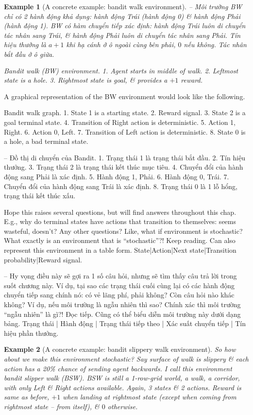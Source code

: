 \documentclass{article}
\newtheorem{example}{Example}
\begin{document}
\begin{itemize}
\begin{itemize}
\begin{itemize}
\begin{example}[A concrete example: bandit walk environment]
                -- Môi trường BW chỉ có 2 hành động khả dụng: hành động Trái (hành động 0) \& hành động Phải (hành động 1). BW có hàm chuyển tiếp xác định: hành động Trái luôn di chuyển tác nhân sang Trái, \& hành động Phải luôn di chuyển tác nhân sang Phải. Tín hiệu thưởng là $a + 1$ khi hạ cánh ở ô ngoài cùng bên phải, $0$ nếu không. Tác nhân bắt đầu ở ô giữa.

                {\sf Bandit walk (BW) environment.} 1. Agent starts in middle of walk. 2. Leftmost state is a hole. 3. Rightmost state is goal, \& provides a $+1$ reward.
            \end{example}
            A graphical representation of the BW environment would look like the following.

            {\sf Bandit walk graph.} 1. State 1 is a starting state. 2. Reward signal. 3. State 2 is a goal terminal state. 4. Transition of Right action is deterministic. 5. Action 1, Right. 6. Action 0, Left. 7. Transition of Left action is deterministic. 8. State 0 is a hole, a bad terminal state.

            -- {\sf Đồ thị di chuyển của Bandit.} 1. Trạng thái 1 là trạng thái bắt đầu. 2. Tín hiệu thưởng. 3. Trạng thái 2 là trạng thái kết thúc mục tiêu. 4. Chuyển đổi của hành động sang Phải là xác định. 5. Hành động 1, Phải. 6. Hành động 0, Trái. 7. Chuyển đổi của hành động sang Trái là xác định. 8. Trạng thái 0 là 1 lỗ hổng, trạng thái kết thúc xấu.

            Hope this raises several questions, but will find answers throughout this chap. E.g., why do terminal states have actions that transition to themselves: seems wasteful, doesn't? Any other questions? Like, what if environment is stochastic? What exactly is an environment that is ``stochastic''?! Keep reading. Can also represent this environment in a table form. State|Action|Next state|Transition probability|Reward signal.

            -- Hy vọng điều này sẽ gợi ra 1 số câu hỏi, nhưng sẽ tìm thấy câu trả lời trong suốt chương này. Ví dụ, tại sao các trạng thái cuối cùng lại có các hành động chuyển tiếp sang chính nó: có vẻ lãng phí, phải không? Còn câu hỏi nào khác không? Ví dụ, nếu môi trường là ngẫu nhiên thì sao? Chính xác thì môi trường ``ngẫu nhiên'' là gì?! Đọc tiếp. Cũng có thể biểu diễn môi trường này dưới dạng bảng. Trạng thái | Hành động | Trạng thái tiếp theo | Xác suất chuyển tiếp | Tín hiệu phần thưởng.

            \begin{example}[A concrete example: bandit slippery walk environment]
                So how about we make this environment stochastic? Say surface of walk is slippery \& each action has a 20\% chance of sending agent backwards. I call this environment bandit slipper walk (BSW). BSW is still a 1-row-grid world, a walk, a corridor, with only Left \& Right actions available. Again, 3 states \& 2 actions. Reward is same as before, $+1$ when landing at rightmost state (except when coming from rightmost state -- from itself), \& $0$ otherwise.


\end{example}
\end{itemize}
\end{itemize}
\end{itemize}
\end{document}
